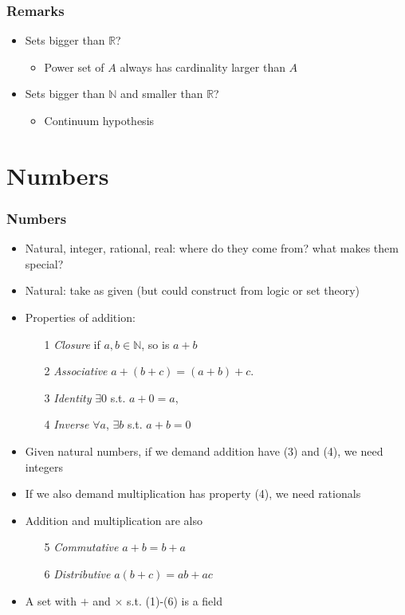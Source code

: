 \documentclass[compress]{beamer}
\begin{document}
\begin{frame}
  \frametitle{Remarks}
  \begin{itemize}
  \item Sets bigger than $\mathbb{R}$?
    \begin{itemize}
    \item Power set of $A$ always has cardinality larger than $A$
    \end{itemize}
  \item Sets bigger than $\mathbb{N}$ and smaller than $\mathbb{R}$?
    \begin{itemize}
    \item Continuum hypothesis 
    \end{itemize}
  \end{itemize}
\end{frame}

\section{Numbers \label{s:numbers}}

\begin{frame}
  \frametitle{Numbers}
  \begin{itemize}
  \item Natural, integer, rational, real: where do they come from?
    what makes them special?
  \item Natural: take as given (but could construct from logic or set
    theory) 
  \end{itemize}
\end{frame}

\begin{frame}
  \begin{itemize}
  \item Properties of addition:
    \begin{itemize}
    \item[1] \emph{Closure} if $a, b \in \mathbb{N}$, so is $a + b$ 
    \item[2] \emph{Associative} $a + (b + c) = (a + b) + c$. 
    \item[3] \emph{Identity} $\exists 0$ s.t. $a + 0 = a$,
    \item[4] \emph{Inverse} $\forall a$, $\exists b$ s.t. $a + b = 0$
    \end{itemize}
  \item Given natural numbers, if we demand addition have (3) and (4),
    we need integers    
  \item If we also demand multiplication has property (4), we need
    rationals
  \item Addition and multiplication are also
    \begin{itemize}
    \item[5] \emph{Commutative} $ a + b = b + a$
    \item[6] \emph{Distributive} $a (b + c) = ab + ac$
    \end{itemize} 
  \item A set with $+$ and $\times$ s.t. (1)-(6) is a field
  \end{itemize}
\end{frame}
\end{document}
